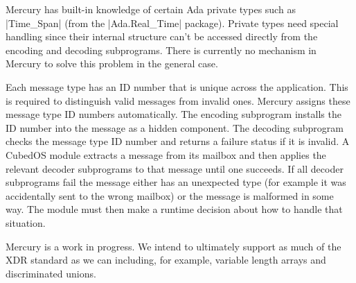 Mercury has built-in knowledge of certain Ada private types such as |Time_Span| (from the
|Ada.Real_Time| package). Private types need special handling since their internal structure
can't be accessed directly from the encoding and decoding subprograms. There is currently no
mechanism in Mercury to solve this problem in the general case.

Each message type has an ID number that is unique across the application. This is required to
distinguish valid messages from invalid ones. Mercury assigns these message type ID numbers
automatically. The encoding subprogram installs the ID number into the message as a hidden
component. The decoding subprogram checks the message type ID number and returns a failure
status if it is invalid. A CubedOS module extracts a message from its mailbox and then applies
the relevant decoder subprograms to that message until one succeeds. If all decoder subprograms
fail the message either has an unexpected type (for example it was accidentally sent to the
wrong mailbox) or the message is malformed in some way. The module must then make a runtime
decision about how to handle that situation.

Mercury is a work in progress. We intend to ultimately support as much of the XDR standard as we
can including, for example, variable length arrays and discriminated unions.
